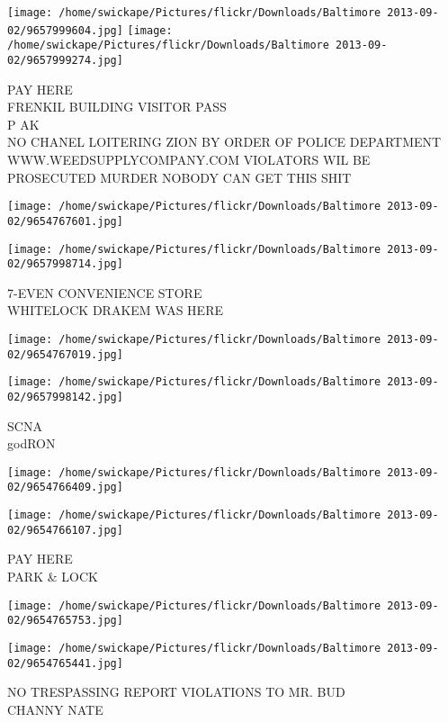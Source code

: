 \documentclass[10pt,letterpaper]{article}
\begin{document}
\texttt{[image: /home/swickape/Pictures/flickr/Downloads/Baltimore 2013-09-02/9657999604.jpg]}
\texttt{[image: /home/swickape/Pictures/flickr/Downloads/Baltimore 2013-09-02/9657999274.jpg]}

PAY HERE\\
FRENKIL BUILDING VISITOR PASS\\
P AK\\
NO CHANEL LOITERING ZION BY ORDER OF POLICE DEPARTMENT WWW.WEEDSUPPLYCOMPANY.COM VIOLATORS WIL BE PROSECUTED MURDER NOBODY CAN GET THIS SHIT
\pagebreak

\texttt{[image: /home/swickape/Pictures/flickr/Downloads/Baltimore 2013-09-02/9654767601.jpg]}

\vspace{0.25in}
\texttt{[image: /home/swickape/Pictures/flickr/Downloads/Baltimore 2013-09-02/9657998714.jpg]}

7{-}EVEN CONVENIENCE STORE\\
WHITELOCK DRAKEM WAS HERE
\pagebreak

\texttt{[image: /home/swickape/Pictures/flickr/Downloads/Baltimore 2013-09-02/9654767019.jpg]}

\vspace{0.25in}
\texttt{[image: /home/swickape/Pictures/flickr/Downloads/Baltimore 2013-09-02/9657998142.jpg]}

SCNA\\
godRON
\pagebreak

\texttt{[image: /home/swickape/Pictures/flickr/Downloads/Baltimore 2013-09-02/9654766409.jpg]}

\vspace{0.25in}
\texttt{[image: /home/swickape/Pictures/flickr/Downloads/Baltimore 2013-09-02/9654766107.jpg]}

PAY HERE\\
PARK \& LOCK
\pagebreak

\texttt{[image: /home/swickape/Pictures/flickr/Downloads/Baltimore 2013-09-02/9654765753.jpg]}

\vspace{0.25in}
\texttt{[image: /home/swickape/Pictures/flickr/Downloads/Baltimore 2013-09-02/9654765441.jpg]}

NO TRESPASSING REPORT VIOLATIONS TO MR. BUD\\
CHANNY NATE
\pagebreak
\end{document}
